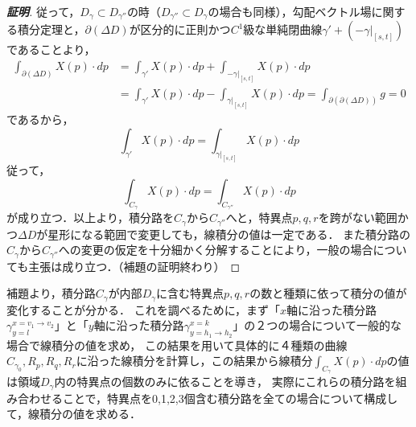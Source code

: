 \documentclass[dvipdfmx,a4paper,uplatex]{jsarticle}
\begin{document}
\begin{proof}[\bf{証明}]
従って，$D_\gamma\subset D_{\gamma''}$の時（$D_{\gamma''}\subset D_\gamma$の場合も同様），勾配ベクトル場に関する積分定理と，$\partial(\Delta D)$が区分的に正則かつ$C^1$級な単純閉曲線$\gamma'+(-\gamma|_{[s,t]})$であることより，
\begin{align*}
    \int_{\partial(\Delta D)}X(p)\cdot dp &= \int_{\gamma'}X(p)\cdot dp + \int_{-\gamma|_{[s,t]}}X(p)\cdot dp \\
    &= \int_{\gamma'}X(p)\cdot dp - \int_{\gamma|_{[s,t]}}X(p)\cdot dp 
    = \int_{\partial(\partial(\Delta D))} g = 0
\end{align*}
であるから，
\[ \int_{\gamma'}X(p)\cdot dp = \int_{\gamma|_{[s,t]}}X(p)\cdot dp \]
従って，
\[ \int_{C_\gamma}X(p)\cdot dp = \int_{C_{\gamma''}}X(p)\cdot dp \]
が成り立つ．以上より，積分路を$C_\gamma$から$C_{\gamma''}$へと，特異点$p,q,r$を跨がない範囲かつ$\Delta D$が星形になる範囲で変更しても，線積分の値は一定である．
また積分路の$C_\gamma$から$C_{\gamma''}$への変更の仮定を十分細かく分解することにより，一般の場合についても主張は成り立つ．（補題の証明終わり）
\end{proof}

補題より，積分路$C_\gamma$が内部$D_\gamma$に含む特異点$p,q,r$の数と種類に依って積分の値が変化することが分かる．
これを調べるために，まず「$x$軸に沿った積分路$\gamma^{x=v_1\to v_2}_{y=l}$」と「$y$軸に沿った積分路$\gamma^{x=k}_{y=h_1\to h_2}$」の２つの場合について一般的な場合で線積分の値を求め，
この結果を用いて具体的に４種類の曲線$C_{\gamma_0},R_p,R_q,R_r$に沿った線積分を計算し，この結果から線積分$\int_{C_\gamma}X(p)\cdot dp$の値は領域$D_\gamma$内の特異点の個数のみに依ることを導き，
実際にこれらの積分路を組み合わせることで，特異点を0,1,2,3個含む積分路を全ての場合について構成して，線積分の値を求める．
\end{document}
